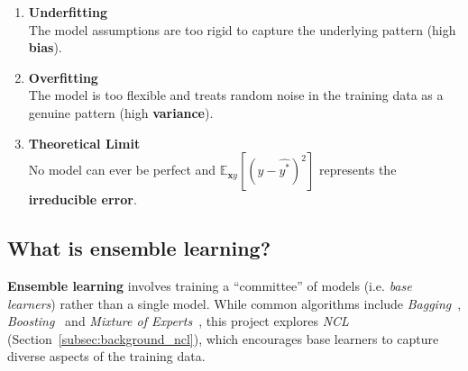 \begin{enumerate}
    \item \textbf{Underfitting} \\
    The model assumptions are too rigid to capture the underlying pattern (high \textbf{bias}). 

    \item \textbf{Overfitting} \\
    The model is too flexible and treats random noise in the training data as a genuine pattern (high \textbf{variance}). 

    \item \textbf{Theoretical Limit} \\
    No model can ever be perfect and $\mathbb{E}_{\mathbf{x}y}\left[(y - \hat{y^*})^2\right]$ represents the \textbf{irreducible error}. 
\end{enumerate}


\subsection{What is ensemble learning? }
\label{subsec:background_ensemble_learning}
\textbf{Ensemble learning} involves training a ``committee'' of models (i.e. \textit{base learners}) rather than a single model. While common algorithms include \textit{Bagging}~\cite{breiman1996bagging}, \textit{Boosting}~\cite{freund1997decision} and \textit{Mixture of Experts}~\cite{jacobs1991adaptive}, this project explores \textit{NCL} (Section~\ref{subsec:background_ncl}), which encourages base learners to capture diverse aspects of the training data. 

